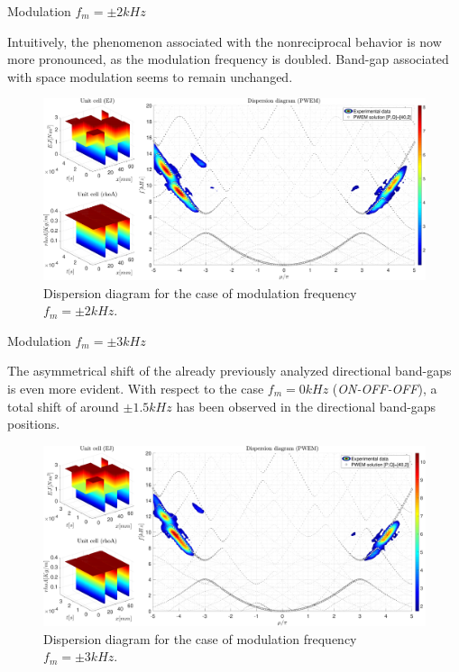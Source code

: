 \begin{frame}{Modulation $f_m = \pm 2kHz$}

    Intuitively, the phenomenon associated with the nonreciprocal behavior is now more pronounced, as the modulation frequency is doubled.
    Band-gap associated with space modulation seems to remain unchanged.

    \begin{figure}[H]
        \centering
        \includegraphics[width=\textwidth]{img/MATLAB/PWEM_EXP Sinusoidal (discrete) @2kHz.pdf}
        \caption{Dispersion diagram for the case of modulation frequency $f_m = \pm 2 kHz$.}
    \end{figure}


\end{frame}



\begin{frame}{Modulation $f_m = \pm 3kHz$}

    The asymmetrical shift of the already previously analyzed directional band-gaps is even more evident.
    With respect to the case $f_m = 0 kHz$ (\textit{ON-OFF-OFF}), a total shift of around $\pm1.5 kHz$ has been observed in the directional band-gaps positions.

    \begin{figure}[H]
        \centering
        \includegraphics[width=\textwidth]{img/MATLAB/PWEM_EXP Sinusoidal (discrete) @3kHz.pdf}
        \caption{Dispersion diagram for the case of modulation frequency $f_m = \pm 3 kHz$.}
    \end{figure}

\end{frame}